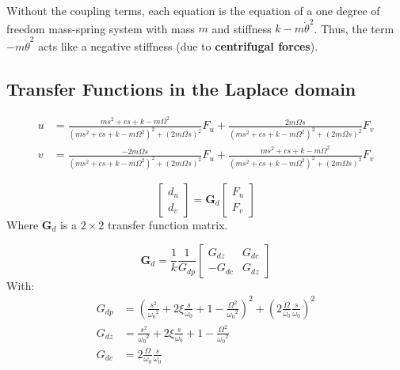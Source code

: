 \documentclass{ISMA_USD2020}
\begin{document}
Without the coupling terms, each equation is the equation of a one degree of freedom mass-spring system with mass \(m\) and stiffness \(k- m\dot{\theta}^2\).
Thus, the term \(- m\dot{\theta}^2\) acts like a negative stiffness (due to \textbf{centrifugal forces}).


\subsection{Transfer Functions in the Laplace domain}
\label{sec:org298e237}

\begin{subequations}
  \begin{align}
    u &= \frac{ms^2 + cs + k - m \Omega^2}{\left( m s^2 + cs + k - m \Omega^2 \right)^2 + \left( 2 m \Omega s \right)^2} F_u +  \frac{2 m \Omega s}{\left( m s^2 + cs + k - m \Omega^2 \right)^2 + \left( 2 m \Omega s \right)^2} F_v \\
    v &= \frac{-2 m \Omega s}{\left( m s^2 + cs + k - m \Omega^2 \right)^2 + \left( 2 m \Omega s \right)^2} F_u +  \frac{ms^2 + cs + k - m \Omega^2}{\left( m s^2 + cs + k - m \Omega^2 \right)^2 + \left( 2 m \Omega s \right)^2} F_v
  \end{align}
\end{subequations}

\begin{equation}
\begin{bmatrix} d_u \\ d_v \end{bmatrix} =
\bm{G}_d
\begin{bmatrix} F_u \\ F_v \end{bmatrix}
\end{equation}
Where \(\bm{G}_d\) is a \(2 \times 2\) transfer function matrix.

\begin{equation}
\bm{G}_d = \frac{1}{k} \frac{1}{G_{dp}}
\begin{bmatrix}
   G_{dz} & G_{dc} \\
  -G_{dc} & G_{dz}
\end{bmatrix}
\end{equation}
With:
\begin{subequations}
  \begin{align}
    G_{dp} &= \left( \frac{s^2}{{\omega_0}^2} + 2 \xi \frac{s}{\omega_0} + 1 - \frac{{\Omega}^2}{{\omega_0}^2} \right)^2 + \left( 2 \frac{\Omega}{\omega_0} \frac{s}{\omega_0} \right)^2 \\
    G_{dz} &= \frac{s^2}{{\omega_0}^2} + 2 \xi \frac{s}{\omega_0} + 1 - \frac{{\Omega}^2}{{\omega_0}^2} \\
    G_{dc} &= 2 \frac{\Omega}{\omega_0} \frac{s}{\omega_0}
  \end{align}
\end{subequations}
\end{document}

